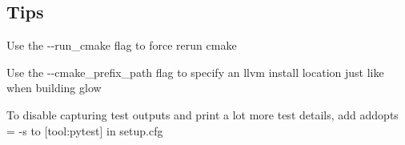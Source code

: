 \subsection*{Tips}


\begin{DoxyItemize}
\item Use the {\ttfamily -\/-\/run\+\_\+cmake} flag to force rerun cmake
\item Use the {\ttfamily -\/-\/cmake\+\_\+prefix\+\_\+path} flag to specify an llvm install location just like when building glow
\item To disable capturing test outputs and print a lot more test details, add {\ttfamily addopts = -\/s} to {\ttfamily \mbox{[}tool\+:pytest\mbox{]}} in setup.\+cfg 
\end{DoxyItemize}